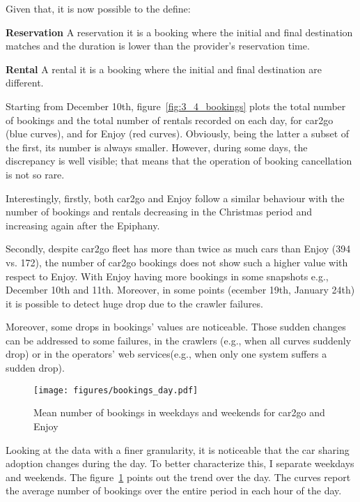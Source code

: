 Given that, it is now possible to the define:
\begin{definition}{\textbf{Reservation}}
	\label{def:reservation} A reservation it is a booking where the initial and final destination matches and the duration is lower than the provider's reservation time.
\end{definition}

\begin{definition}{\textbf{Rental}}
	\label{def:rental} A rental it is a booking where the initial and final destination are different.
\end{definition}


Starting from December 10th, figure~\ref{fig:3_4_bookings} plots the total number of bookings and the total number of rentals recorded on each day, for car2go (blue curves), and for Enjoy (red curves). Obviously, being the latter a subset of the first, its number is always smaller. However, during some days, the discrepancy is well visible; that means that the operation of booking cancellation is not so rare.

Interestingly, firstly, both car2go and Enjoy follow a similar behaviour with the number of bookings and rentals decreasing in the Christmas period and increasing again after the Epiphany. 

Secondly, despite car2go fleet has more than twice as much cars than Enjoy (394 vs. 172), the number of car2go bookings does not show such a higher value with respect to Enjoy. With Enjoy having more bookings in some snapshots e.g., December 10th and 11th. Moreover, in some points (ecember 19th, January 24th) it is possible to detect huge drop due to the crawler failures. 

Moreover, some drops in bookings' values are noticeable. Those sudden changes can be addressed to some failures, in the crawlers (e.g., when all curves suddenly drop) or in the operators' web services(e.g., when only one system suffers a sudden drop).



\begin{figure}
\centering
 \texttt{[image: figures/bookings\_day.pdf]}
 \caption{Mean number of bookings in weekdays and weekends for car2go and Enjoy\label{fig:3_4_bookingsweek}}
\end{figure}

Looking at the data with a finer granularity, it is noticeable that the car sharing adoption changes during the day. To better characterize this, I separate weekdays and weekends. The figure~\ref{fig:3_4_bookingsweek} points out the trend over the day. The curves report the average number of bookings over the entire period  in each hour of the day.

